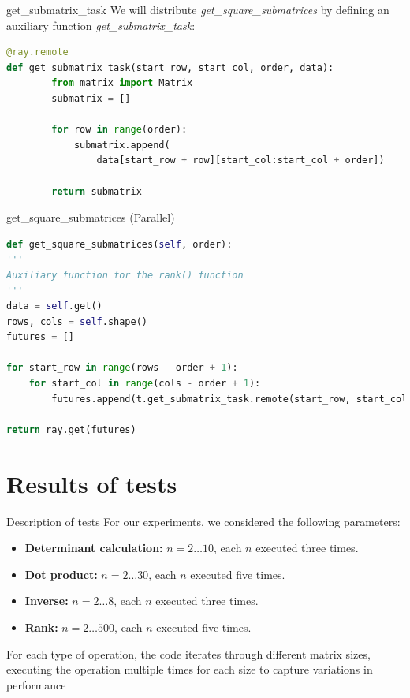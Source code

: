 \documentclass{beamer}
\begin{document}
\begin{frame}[fragile]{{get\_submatrix\_task}}
    We will distribute \textit{get\_square\_submatrices} by defining an auxiliary function \textit{get\_submatrix\_task}:

    \begin{lstlisting}[language=Python]
@ray.remote
def get_submatrix_task(start_row, start_col, order, data):
        from matrix import Matrix
        submatrix = []

        for row in range(order):
            submatrix.append(
                data[start_row + row][start_col:start_col + order])
            
        return submatrix
        \end{lstlisting}
\end{frame}
\begin{frame}[fragile]{get\_square\_submatrices (Parallel)}
    \begin{lstlisting}[language=Python]
def get_square_submatrices(self, order):
'''
Auxiliary function for the rank() function
'''
data = self.get()
rows, cols = self.shape()
futures = []

for start_row in range(rows - order + 1):
    for start_col in range(cols - order + 1):            
        futures.append(t.get_submatrix_task.remote(start_row, start_col, order, data))

return ray.get(futures) 
        \end{lstlisting}
\end{frame}
\section{Results of tests}
\begin{frame}[fragile]{Description of tests}
    For our experiments, we considered the following parameters:
\begin{itemize}
    \item \textbf{Determinant calculation:} $n = 2 \dots 10$, each $n$ executed three times.
    \item \textbf{Dot product:} $n = 2 \dots 30$, each $n$ executed five times.
    \item \textbf{Inverse:} $n = 2 \dots 8$, each $n$ executed three times.
    \item \textbf{Rank:} $n = 2 \dots 500$, each $n$ executed five times.
\end{itemize}
\vfill
For each type of operation, the code iterates through different matrix sizes, executing the operation multiple times for each size to capture variations in performance
\end{frame}
\end{document}
